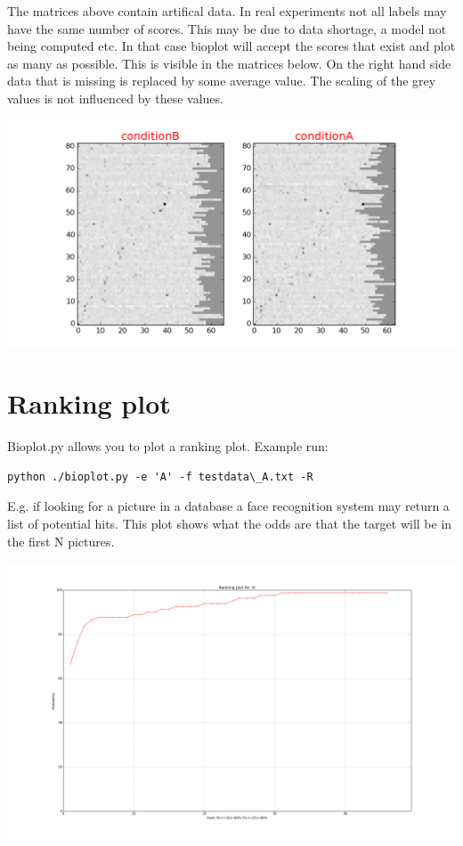 \documentclass[letterpaper,10pt,english]{sphinxmanual}
\begin{document}
The matrices above contain artifical data. In real experiments not all labels may have the same number of scores. This may be due to data shortage, a model not being computed etc. In that case bioplot will accept the scores that exist and plot as many as possible. This is visible in the matrices below. On the right hand side data that is missing is replaced by some average value. The scaling of the grey values is not influenced by these values.

\includegraphics{images/real_data_matrix_plot.png}


\chapter{Ranking plot}
\label{rankingplot:ranking-plot}\label{rankingplot::doc}
Bioplot.py allows you to plot a ranking plot. Example run:

\begin{Verbatim}[commandchars=\\\{\}]
python ./bioplot.py -e 'A' -f testdata\_A.txt -R
\end{Verbatim}

E.g. if looking for a picture in a database a face recognition system may return a list of potential hits. This plot shows what the odds are that the target will be in the first N pictures.

\includegraphics{images/A_ranking_plot.png}
\end{document}
